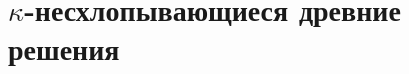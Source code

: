\section{\texorpdfstring{$\kappa$-несхлопывающиеся древние решения}{κ-несхлопывающиеся древние решения}}








